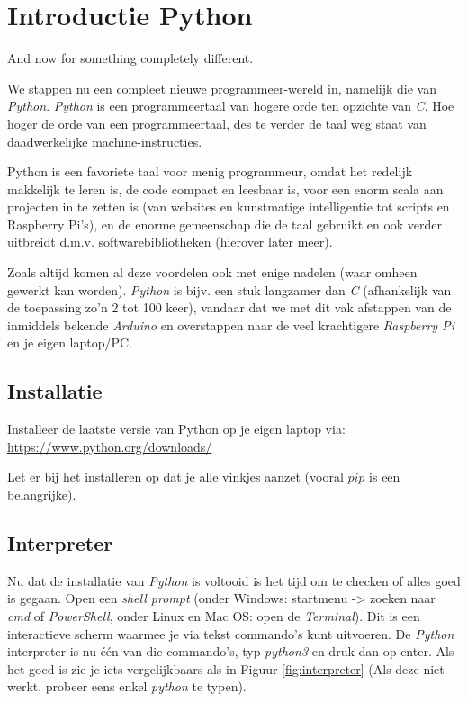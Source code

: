 \chapter{Introductie Python}
\begin{fquote}
	And now for something completely different.
\end{fquote}

We stappen nu een compleet nieuwe programmeer-wereld in, namelijk die van \textit{Python}. \textit{Python} is een programmeertaal van hogere orde ten opzichte van \textit{C}. Hoe hoger de orde van een programmeertaal, des te verder de taal weg staat van daadwerkelijke machine-instructies.

Python is een favoriete taal voor menig programmeur, omdat het redelijk makkelijk te leren is, de code compact en leesbaar is, voor een enorm scala aan projecten in te zetten is (van websites en kunstmatige intelligentie tot scripts en Raspberry Pi's), en de enorme gemeenschap die de taal gebruikt en ook verder uitbreidt d.m.v. softwarebibliotheken (hierover later meer). 

Zoals altijd komen al deze voordelen ook met enige nadelen (waar omheen gewerkt kan worden). \textit{Python} is bijv. een stuk langzamer dan \textit{C} (afhankelijk van de toepassing zo'n 2 tot 100 keer), vandaar dat we met dit vak afstappen van de inmiddels bekende \textit{Arduino} en overstappen naar de veel krachtigere \textit{Raspberry Pi} en je eigen laptop/PC.

\section{Installatie}
\vspace{5mm} 
\begin{exercise}
Installeer de laatste versie van Python op je eigen laptop via: \url{https://www.python.org/downloads/}

Let er bij het installeren op dat je alle vinkjes aanzet (vooral $pip$ is een belangrijke).
\end{exercise}

\section{Interpreter}
Nu dat de installatie van \textit{Python} is voltooid is het tijd om te checken of alles goed is gegaan. Open een \textit{shell prompt} (onder Windows: startmenu -> zoeken naar \textit{cmd} of \textit{PowerShell}, onder Linux en Mac OS: open de \textit{Terminal}). Dit is een interactieve scherm waarmee je via tekst commando's kunt uitvoeren. De \textit{Python} interpreter is nu één van die commando's, typ \textit{python3} en druk dan op enter. Als het goed is zie je iets vergelijkbaars als in Figuur \ref{fig:interpreter} (Als deze niet werkt, probeer eens enkel \textit{python} te typen).

